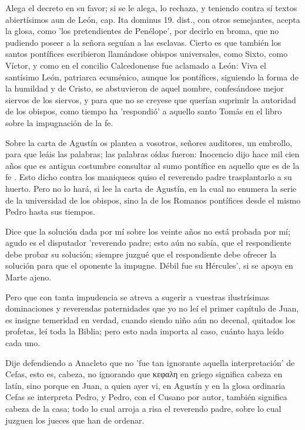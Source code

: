 Alega el decreto en su favor; si se le alega, lo rechaza, y teniendo contra sí textos abiertísimos aun de León, cap. Ita dominus 19. dist., con otros semejantes, acepta la glosa, como 'los pretendientes de Penélope', por decirlo en broma, que no pudiendo poseer a la señora seguían a las esclavas. Cierto es que también los santos pontífices escribieron llamándose obispos universales, como Sixto, como Víctor, y como en el concilio Calcedonense fue aclamado a León: Viva el santísimo León, patriarca ecuménico, aunque los pontífices, siguiendo la forma de la humildad y de Cristo, se abstuvieron de aquel nombre, confesándose mejor siervos de los siervos, y para que no se creyese que querían suprimir la autoridad de los obispos, como tiempo ha 'respondió' a aquello santo Tomás en el libro sobre la impugnación de la fe.

Sobre la carta de Agustín os plantea a vosotros, señores auditores, un embrollo, para que leáis las palabras; las palabras oídas fueron: Inocencio dijo hace mil cien años que es antigua costumbre consultar al sumo pontífice en aquello que es de la fe \marginpar{\small[307]}. Esto dicho contra los maniqueos quiso el reverendo padre trasplantarlo a su huerto. Pero no lo hará, si lee la carta de Agustín, en la cual no enumera la serie de la universidad de los obispos, sino la de los Romanos pontífices desde el mismo Pedro hasta sus tiempos.

Dice que la solución dada por mí sobre los veinte años no está probada por mí; agudo es el disputador 'reverendo padre; esto aún no sabía, que el respondiente debe probar su solución; siempre juzgué que el respondiente debe ofrecer la solución para que el oponente la impugne. Débil fue su Hércules', si se apoya en Marte ajeno.

Pero que con tanta impudencia se atreva a sugerir a vuestras ilustrísimas dominaciones y reverendas paternidades que yo no leí el primer capítulo de Juan, es insigne temeridad en verdad, cuando siendo niño aún no decenal, quitados los profetas, leí toda la Biblia; pero esto nada importa al caso, cuánto haya leído cada uno.

Dije defendiendo a Anacleto que no 'fue tan ignorante aquella interpretación' de Cefas, esto es, cabeza, no ignorando que κεφαλη en griego significa cabeza en latín, sino porque en Juan, a quien ayer vi, en Agustín y en la glosa ordinaria Cefas se interpreta Pedro, y Pedro, con el Cusano por autor, también significa cabeza de la casa; todo lo cual arroja a risa el reverendo padre, sobre lo cual juzguen los jueces que han de ordenar.

